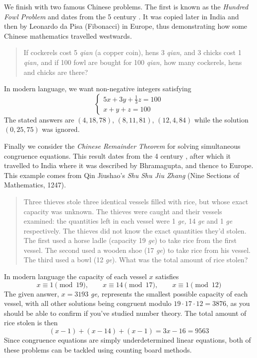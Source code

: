 
We finish with two famous Chinese problems. The first is known as the  \emph{Hundred Fowl Problem} and dates from the 5\th{} century \AD\!. It was copied later in India and then by Leonardo da Pisa (Fibonacci) in Europe, thus demonstrating how some Chinese mathematics travelled westwards.

\begin{quote}
If cockerels cost 5 \emph{qian } (a copper coin), hens 3 \emph{qian,} and 3 chicks cost 1 \emph{qian,} and if 100 fowl are bought for 100 \emph{qian,} how many cockerels, hens and chicks are there?
\end{quote}

In modern language, we want non-negative integers satisfying
  \[\begin{cases}
  5x+3y+\frac 13z=100\\
  x+y+z=100
  \end{cases}\]
The stated answers are $(4,18,78)$, $(8,11,81)$, $(12,4,84)$ while the solution $(0,25,75)$ was ignored.\bigbreak

  
Finally we consider the \emph{Chinese Remainder Theorem} for solving simultaneous congruence equations. This result dates from the 4\th{} century \AD\!, after which it travelled to India where it was described by Bhramagupta, and thence to Europe. This example comes from Qin Jiushao's \emph{Shu Shu Jiu Zhang} (Nine Sections of Mathematics, 1247).  

\begin{quote}
Three thieves stole three identical vessels filled with rice, but whose exact capacity was unknown. The thieves were caught and their vessels examined: the quantities left in each vessel were 1 \emph{ge,} 14 \emph{ge} and 1 \emph{ge} respectively. The thieves did not know the exact quantities they'd stolen. The first used a horse ladle (capacity 19 \emph{ge}) to take rice from the first vessel. The second used a wooden shoe (17 \emph{ge}) to take rice from his vessel. The third used a bowl (12 \emph{ge}). What was the total amount of rice stolen?
\end{quote}
  
In modern language the capacity of each vessel $x$ satisfies
\[x\equiv 1\pmod{19},\qquad x\equiv 14\pmod{17},\qquad x\equiv 1\pmod{12}\]
The given answer, $x=3193$ \emph{ge,} represents the smallest possible capacity of each vessel, with all other solutions being congruent modulo $19\cdot 17\cdot 12=3876$, as you should be able to confirm if you've studied number theory. The total amount of rice stolen is then
\[(x-1)+(x-14)+(x-1)=3x-16=9563\]
Since congruence equations are simply underdetermined linear equations, both of these problems can be tackled using counting board methods.
  
